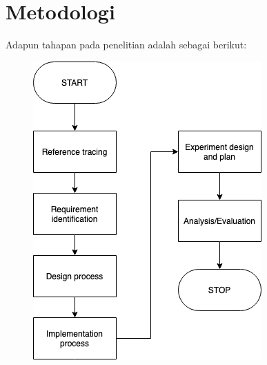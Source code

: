 %



\section{Metodologi}

Adapun tahapan pada penelitian adalah sebagai berikut:

\begin{figure}[H]
	\centering
	\includegraphics[width=0.7\linewidth]{figure/Metode-Penelitian-flow.png}
	\caption[Metode Penelitian]{}
	\label{fig:metode-penelitian-flow}
\end{figure}


